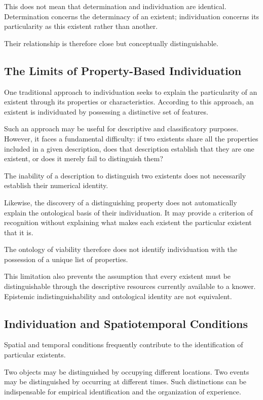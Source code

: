 This does not mean that determination and individuation are identical. Determination concerns the determinacy of an existent; individuation concerns its particularity as this existent rather than another.

Their relationship is therefore close but conceptually distinguishable.

\subsection{The Limits of Property-Based Individuation}

One traditional approach to individuation seeks to explain the particularity of an existent through its properties or characteristics. According to this approach, an existent is individuated by possessing a distinctive set of features.

Such an approach may be useful for descriptive and classificatory purposes. However, it faces a fundamental difficulty: if two existents share all the properties included in a given description, does that description establish that they are one existent, or does it merely fail to distinguish them?

The inability of a description to distinguish two existents does not necessarily establish their numerical identity.

Likewise, the discovery of a distinguishing property does not automatically explain the ontological basis of their individuation. It may provide a criterion of recognition without explaining what makes each existent the particular existent that it is.

The ontology of viability therefore does not identify individuation with the possession of a unique list of properties.

This limitation also prevents the assumption that every existent must be distinguishable through the descriptive resources currently available to a knower. Epistemic indistinguishability and ontological identity are not equivalent.

\subsection{Individuation and Spatiotemporal Conditions}

Spatial and temporal conditions frequently contribute to the identification of particular existents.

Two objects may be distinguished by occupying different locations. Two events may be distinguished by occurring at different times. Such distinctions can be indispensable for empirical identification and the organization of experience.

